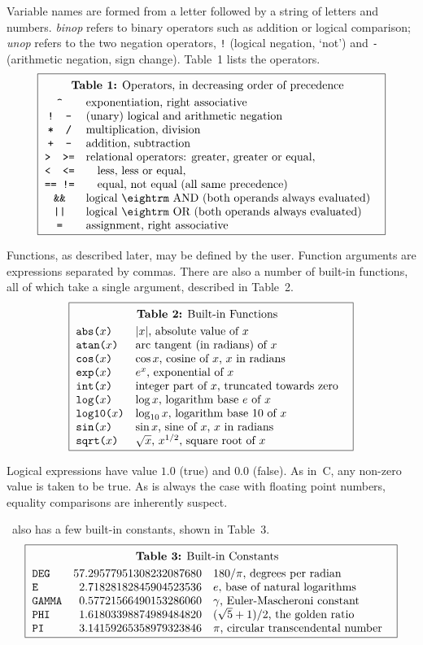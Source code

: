 Variable names are formed from a letter followed by a string of
letters and numbers. {\it binop\/} refers to binary operators such
as addition or logical comparison; {\it unop\/} refers to the two
negation operators, {\tt!} (logical negation, `not') and {\tt-}
(arithmetic negation, sign change). Table~1 lists the operators.
$$
\boxit{\vbox{\halign{\tabskip1em\tt\hfil#\hfil&#\hfil\cr
  \omit\span\hfil{\bf Table~1:} Operators, in decreasing order of precedence\cr
  \noalign{\smallskip}
  \char"5E&  exponentiation, right associative\cr
  !  -&      (unary) logical and arithmetic negation\cr
  * \ /&     multiplication, division\cr
  + \ -&     addition, subtraction\cr
  > \ >=&    relational operators: greater, greater or equal,\cr
  < \ <=&    \quad less, less or equal,\cr
  == !=&     \quad equal, not equal (all same precedence)\cr
  \&\&&      logical {\eightrm AND} (both operands always evaluated)\cr
  \char"7C\char"7C & logical {\eightrm OR} (both operands always evaluated)\cr
  =&         assignment, right associative\cr}}}
$$

Functions, as described later, may be defined by the user.
Function arguments are expressions separated by commas.
There are also a number of built-in functions, all of which
take a single argument, described in Table~2.
$$
\boxit{\vbox{\halign{\tabskip1em\tt#\hfil&#\hfil\cr
  \omit\span\hfil{\bf Table~2:} Built-in Functions\cr
  \noalign{\smallskip}
  abs($x$)&    $|x|$, absolute value of $x$\cr
  atan($x$)&   arc tangent (in radians) of $x$\cr
  cos($x$)&    $\cos x$, cosine of $x$, $x$ in radians\cr
  exp($x$)&    $e^x$, exponential of $x$\cr
  int($x$)&    integer part of $x$, truncated towards zero\cr
  log($x$)&    $\log x$, logarithm base $e$ of $x$\cr
  log10($x$)&  $\log_{10}x$, logarithm base 10 of $x$\cr
  sin($x$)&    $\sin x$, sine of $x$, $x$ in radians\cr
  sqrt($x$)&   $\sqrt x$, $x^{1/2}$, square root of $x$\cr}}}
$$

Logical expressions have value $1.0$ (true) and $0.0$ (false).
As in~C, any non-zero value is taken to be true. As is always
the case with floating point numbers, equality comparisons are
inherently suspect.

\hoc\ also has a few built-in constants, shown in Table~3.
$$
\boxit{\vbox{\halign{\tabskip1em\tt#\hfil&#\hfil&#\hfil\cr
  \omit\span\span\hfil{\bf Table~3:} Built-in Constants\hfil\cr
  \noalign{\smallskip}
  DEG&     57.29577951308232087680& $180/\pi$, degrees per radian\cr
  E&      \02.71828182845904523536& $e$, base of natural logarithms\cr
  GAMMA&  \00.57721566490153286060& $\gamma$, Euler-Mascheroni constant\cr
  PHI&    \01.61803398874989484820& $(\sqrt 5+1)/2$, the golden ratio\cr
  PI&     \03.14159265358979323846& $\pi$, circular transcendental number\cr}}}
$$

